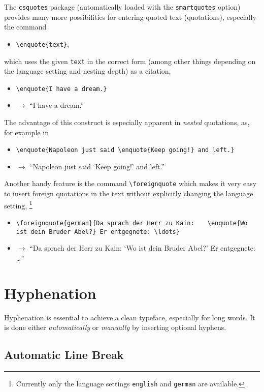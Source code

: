 The \texttt{csquotes} package (automatically loaded with the
\texttt{smartquotes} option) provides many more possibilities for entering
quoted text (quotations), especially the command
%
\begin{itemize}
    \item[] \verb!\enquote{text}!,
\end{itemize}
%
which uses the given \texttt{text} in the correct form (among other things
depending on the language setting and nesting depth) as a citation, \eg
%
\begin{itemize}
    \item[] \verb|\enquote{I have a dream.}|
    \item[] $\rightarrow$ \enquote{I have a dream.}
\end{itemize}
%
The advantage of this construct is especially apparent in \emph{nested}
quotations, as, for example in
%
\begin{itemize}
    \item[] \verb|\enquote{Napoleon just said \enquote{Keep going!} and left.}|
    \item[] $\rightarrow$ \enquote{Napoleon just said \enquote{Keep going!} and
    left.}
\end{itemize}
%
Another handy feature is the command \verb!\foreignquote! which makes it very
easy to insert foreign quotations in the text without explicitly changing the
language setting, \eg%
\footnote{Currently only the language settings \texttt{english} and
\texttt{german} are available.}
%
\begin{itemize}
    \item[] \verb|\foreignquote{german}{Da sprach der Herr zu Kain:|\newline
    \verb|   \enquote{Wo ist dein Bruder Abel?} Er entgegnete: \ldots}|
    \item[] $\rightarrow$ \foreignquote{german}{Da sprach der Herr zu Kain:
    \enquote{Wo ist dein Bruder Abel?}  Er entgegnete: \ldots}
\end{itemize}


\section{Hyphenation}
\label{subsec:hyphenation}

Hyphenation is essential to achieve a clean typeface, especially for long words.
It is done either \emph{automatically} or \emph{manually} by inserting optional
hyphens.

\subsection{Automatic Line Break}

